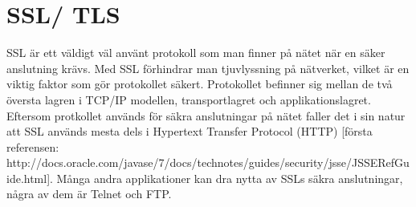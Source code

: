 \section{SSL/ TLS}
SSL är ett väldigt väl använt protokoll som man finner på nätet när en säker anslutning krävs. Med SSL förhindrar man tjuvlyssning på nätverket, vilket är en viktig faktor som gör protokollet säkert. Protokollet befinner sig mellan de två översta lagren i TCP/IP modellen, transportlagret och applikationslagret. Eftersom protkollet används för säkra anslutningar på nätet faller det i sin natur att SSL används mesta dels i Hypertext Transfer Protocol (HTTP) [första referensen: http://docs.oracle.com/javase/7/docs/technotes/guides/security/jsse/JSSERefGuide.html]. Många andra applikationer kan dra nytta av SSLs säkra anslutningar, några av dem är Telnet och FTP. 